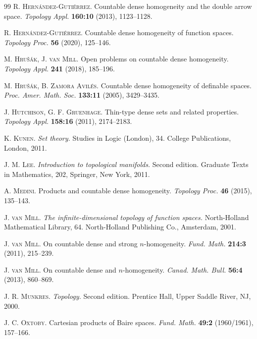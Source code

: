 \documentclass{amsart}
\theoremstyle{plain}
\theoremstyle{definition}
\begin{document}
\begin{thebibliography}{99}
\textsc{R. Hern\'{a}ndez-Guti\'{e}rrez.} Countable dense homogeneity and the double arrow space. \textit{Topology Appl.} \textbf{160:10} (2013), 1123--1128.

\textsc{R. Hern\'{a}ndez-Guti\'{e}rrez.} Countable dense homogeneity of function spaces. \textit{Topology Proc.} \textbf{56} (2020), 125--146.

\textsc{M. Hru\v{s}\'{a}k, J. van Mill.} Open problems on countable dense homogeneity. \textit{Topology Appl.} \textbf{241} (2018), 185--196.

\textsc{M. Hru\v{s}\'{a}k, B. Zamora Avil\'{e}s.} Countable dense homogeneity of definable spaces. \textit{Proc. Amer. Math. Soc.} \textbf{133:11} (2005), 3429--3435.

\textsc{J. Hutchison, G. F. Gruenhage.} Thin-type dense sets and related properties. \textit{Topology Appl.} \textbf{158:16} (2011), 2174--2183.

\textsc{K. Kunen.} \textit{Set theory.} Studies in Logic (London), 34. College Publications, London, 2011.

\textsc{J. M. Lee.} \textit{Introduction to topological manifolds.} Second edition. Graduate Texts in Mathematics, 202, Springer, New York, 2011.

\textsc{A. Medini.} Products and countable dense homogeneity. \textit{Topology Proc.} \textbf{46} (2015), 135--143.

\textsc{J. van Mill.} \textit{The infinite-dimensional topology of function spaces.} North-Holland Mathematical Library, 64. North-Holland Publishing Co., Amsterdam, 2001.

\textsc{J. van Mill.} On countable dense and strong $n$-homogeneity. \textit{Fund. Math.} \textbf{214:3} (2011), 215--239.

\textsc{J. van Mill.} On countable dense and $n$-homogeneity. \textit{Canad. Math. Bull.} \textbf{56:4} (2013), 860--869.

\textsc{J. R. Munkres.} \textit{Topology.} Second edition. Prentice Hall, Upper Saddle River, NJ, 2000.

\textsc{J. C. Oxtoby.} Cartesian products of Baire spaces. \textit{Fund. Math.} \textbf{49:2} (1960/1961), 157--166.


\end{thebibliography}
\end{document}
